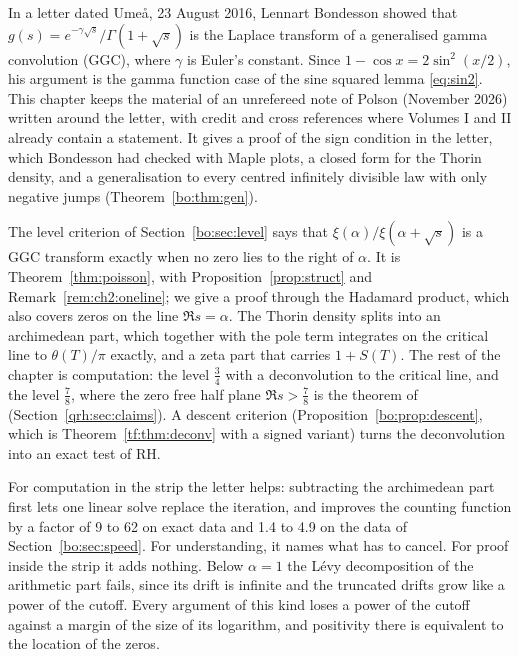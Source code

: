 \label{bo:ch:bondesson}

In a letter dated Ume\aa, 23 August 2016, Lennart Bondesson showed that $g(s)=e^{-\gamma\sqrt s}/\Gamma(1+\sqrt s)$ is the Laplace transform of a generalised gamma convolution (GGC), where $\gamma$ is Euler's constant. Since $1-\cos x=2\sin^2(x/2)$, his argument is the gamma function case of the sine squared lemma \eqref{eq:sin2}. This chapter keeps the material of an unrefereed note of Polson (November 2026) written around the letter, with credit and cross references where Volumes I and II already contain a statement. It gives a proof of the sign condition in the letter, which Bondesson had checked with Maple plots, a closed form for the Thorin density, and a generalisation to every centred infinitely divisible law with only negative jumps (Theorem~\ref{bo:thm:gen}).

The level criterion of Section~\ref{bo:sec:level} says that $\xi(\alpha)/\xi(\alpha+\sqrt s)$ is a GGC transform exactly when no zero lies to the right of $\alpha$. It is Theorem~\ref{thm:poisson}, with Proposition~\ref{prop:struct} and Remark~\ref{rem:ch2:oneline}; we give a proof through the Hadamard product, which also covers zeros on the line $\Re s=\alpha$. The Thorin density splits into an archimedean part, which together with the pole term integrates on the critical line to $\theta(T)/\pi$ exactly, and a zeta part that carries $1+S(T)$. The rest of the chapter is computation: the level $\frac34$ with a deconvolution to the critical line, and the level $\frac78$, where the zero free half plane $\Re s>\frac78$ is the theorem of \cite{OAI26a} (Section~\ref{qrh:sec:claims}). A descent criterion (Proposition~\ref{bo:prop:descent}, which is Theorem~\ref{tf:thm:deconv} with a signed variant) turns the deconvolution into an exact test of RH.

For computation in the strip the letter helps: subtracting the archimedean part first lets one linear solve replace the iteration, and improves the counting function by a factor of 9 to 62 on exact data and 1.4 to 4.9 on the data of Section~\ref{bo:sec:speed}. For understanding, it names what has to cancel. For proof inside the strip it adds nothing. Below $\alpha=1$ the L\'evy decomposition of the arithmetic part fails, since its drift is infinite and the truncated drifts grow like a power of the cutoff. Every argument of this kind loses a power of the cutoff against a margin of the size of its logarithm, and positivity there is equivalent to the location of the zeros.

